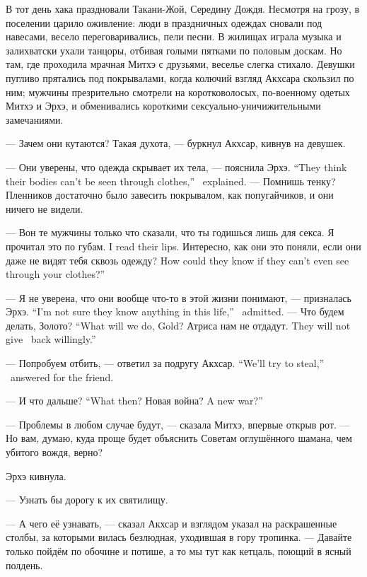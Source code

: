 В тот день хака праздновали Такани-Жой, Середину Дождя.
Несмотря на грозу, в поселении царило оживление: люди в праздничных одеждах сновали под навесами, весело переговаривались, пели песни.
В жилищах играла музыка и залихватски ухали танцоры, отбивая голыми пятками по половым доскам.
Но там, где проходила мрачная Митхэ с друзьями, веселье слегка стихало.
Девушки пугливо прятались под покрывалами, когда колючий взгляд Акхсара скользил по ним;
мужчины презрительно смотрели на коротковолосых, по-военному одетых Митхэ и Эрхэ, и обменивались короткими сексуально-уничижительными замечаниями.

--- Зачем они кутаются?
Такая духота, --- буркнул Акхсар, кивнув на девушек.

{--- Они уверены, что одежда скрывает их тела, --- пояснила Эрхэ.}
{``They think their bodies can't be seen through clothes,'' \Oerchoe\ explained.}
--- Помнишь тенку?
Пленников достаточно было завесить покрывалом, как попугайчиков, и они ничего не видели.

--- Вон те мужчины только что сказали, что ты годишься лишь для секса.
{Я прочитал это по губам.}
{I read their lips.}
{Интересно, как они это поняли, если они даже не видят тебя сквозь одежду?}
{How could they know if they can't even see through your clothes?''}

{--- Я не уверена, что они вообще что-то в этой жизни понимают, --- призналась Эрхэ.}
{``I'm not sure they know anything in this life,'' \Oerchoe\ admitted.}
{--- Что будем делать, Золото?}
{``What will we do, Gold?}
{Атриса нам не отдадут.}
{They will not give \Aatris\ back willingly.''}

{--- Попробуем отбить, --- ответил за подругу Акхсар.}
{``We'll try to steal,'' \Akchsar\ answered for the friend.}

{--- И что дальше?}
{``What then?}
{Новая война?}
{A new war?''}

--- Проблемы в любом случае будут, --- сказала Митхэ, впервые открыв рот.
--- Но вам, думаю, куда проще будет объяснить Советам оглушённого шамана, чем убитого вождя, верно?

Эрхэ кивнула.

--- Узнать бы дорогу к их святилищу.

--- А чего её узнавать, --- сказал Акхсар и взглядом указал на раскрашенные столбы, за которыми вилась безлюдная, уходившая в гору тропинка.
--- Давайте только пойдём по обочине и потише, а то мы тут как кетцаль, поющий в ясный полдень.

